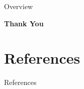 \documentclass[aspectratio=169,xcolor=dvipsnames]{beamer}
\begin{document}
\begin{frame}
	\titlepage
\end{frame}

\begin{frame}{Overview}
	\tableofcontents
\end{frame}



\begin{frame}[plain]
	\vfill
	\centering
	\Huge\textbf{\textcolor{structure}{Thank You}}
	\vfill
\end{frame}

\section*{References}
\begin{frame}[allowframebreaks]{References}
	\footnotesize
	\printbibliography
\end{frame}


\appendix

\end{document}
